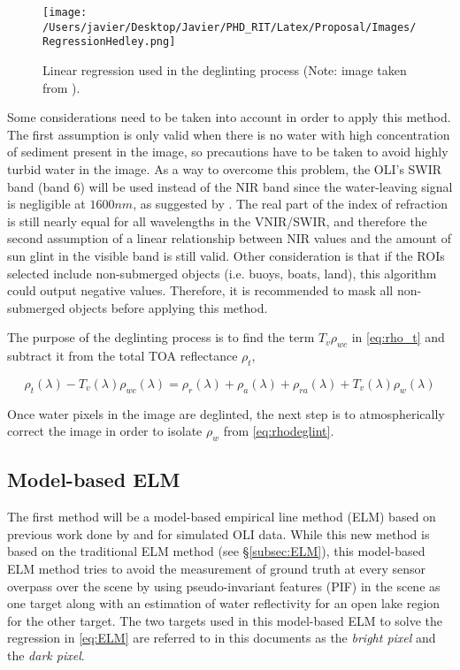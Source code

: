 \begin{figure}[!ht]
  \centering
  \texttt{[image: /Users/javier/Desktop/Javier/PHD\_RIT/Latex/Proposal/Images/RegressionHedley.png]}
  \caption{Linear regression used in the deglinting process (Note: image taken from \cite{Hedley:2005}). \label{fig:regressiohedley} } 
\end{figure}

Some considerations need to be taken into account in order to apply this method. The first assumption is only valid when there is no water with high concentration of sediment present in the image, so precautions have to be taken to avoid highly turbid water in the image. As a way to overcome this problem, the OLI's SWIR band (band 6) will be used instead of the NIR band since the water-leaving signal is negligible at $1600nm$, as suggested by \cite{GeraceThesis}. The real part of the index of refraction is still nearly equal for all wavelengths in the VNIR/SWIR, and therefore the second assumption of a linear relationship between NIR values and the amount of sun glint in the visible band is still valid. Other consideration is that if the ROIs selected include non-submerged objects (i.e. buoys, boats, land), this algorithm could output negative values. Therefore, it is recommended to mask all non-submerged objects before applying this method.


The purpose of the deglinting process is to find the term $T_v\rho_{wc}$ in \autoref{eq:rho_t} and subtract it from the total TOA reflectance $\rho_t$,

\begin{equation}\label{eq:rhodeglint}
  \rho_t(\lambda)-T_v(\lambda)\rho_{wc}(\lambda) = \rho_r(\lambda)+\rho_a(\lambda)+\rho_{ra}(\lambda)+T_v(\lambda)\rho_{w}(\lambda)
\end{equation}

Once water pixels in the image are deglinted, the next step is to atmospherically correct the image in order to isolate $\rho_w$ from \autoref{eq:rhodeglint}.



\subsection{Model-based ELM}
The first method will be a model-based empirical line method (ELM) based on previous work done by \cite{Gerace:2013} and \cite{Gerace:2012}  for simulated OLI data. While this new method is based on the traditional ELM method (see \S\ref{subsec:ELM}), this model-based ELM method tries to avoid the measurement of ground truth at every sensor overpass over the scene by using pseudo-invariant features (PIF)  in the scene as one target along with an estimation of water reflectivity for an open lake region for the other target. The two targets used in this model-based ELM to solve the regression in \autoref{eq:ELM} are referred to in this documents as the {\it bright pixel}  and the {\it dark pixel}.

